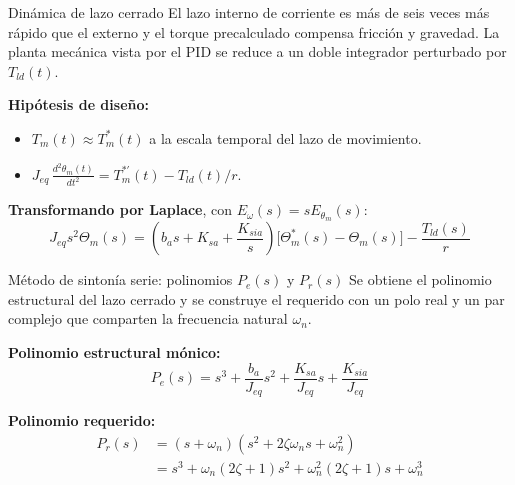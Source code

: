 \documentclass[aspectratio=169,t]{beamer}
\begin{document}
\begin{frame}{Dinámica de lazo cerrado}
{\small\color{uncGray}El lazo interno de corriente es más de seis veces más rápido que el externo y el torque precalculado compensa fricción y gravedad. La planta mecánica vista por el PID se reduce a un doble integrador perturbado por $T_{ld}(t)$.}\par
\vspace{3mm}

\textbf{Hipótesis de diseño:}
\begin{itemize}
\item $T_m(t)\approx T_m^*(t)$ a la escala temporal del lazo de movimiento.
\item $J_{eq}\,\frac{d^2\theta_m(t)}{dt^2}=T_m^{*\prime}(t)-T_{ld}(t)/r$.
\end{itemize}

\textbf{Transformando por Laplace}, con $E_\omega(s)=sE_{\theta_m}(s)$:
\begin{equation*}
J_{eq}s^2\Theta_m(s)=\left(b_as+K_{sa}+\frac{K_{sia}}{s}\right)
\big[\Theta_m^*(s)-\Theta_m(s)\big]-\frac{T_{ld}(s)}{r}
\end{equation*}
\end{frame}

\begin{frame}{Método de sintonía serie: polinomios $P_e(s)$ y $P_r(s)$}
{\small\color{uncGray}Se obtiene el polinomio estructural del lazo cerrado y se construye el requerido con un polo real y un par complejo que comparten la frecuencia natural $\omega_n$.}\par
\vspace{3mm}

\textbf{Polinomio estructural mónico:}
\begin{equation*}
\boxed{P_e(s)=s^3+\frac{b_a}{J_{eq}}s^2+\frac{K_{sa}}{J_{eq}}s+\frac{K_{sia}}{J_{eq}}}
\end{equation*}

\textbf{Polinomio requerido:}
\begin{align*}
P_r(s)&=(s+\omega_n)(s^2+2\zeta\omega_ns+\omega_n^2)\\
&=s^3+\omega_n(2\zeta+1)s^2+\omega_n^2(2\zeta+1)s+\omega_n^3
\end{align*}
\end{frame}
\end{document}
